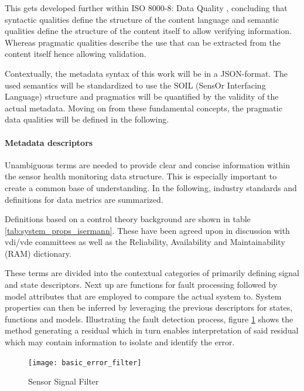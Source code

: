 This gets developed further within ISO 8000-8: Data Quality \cite{iso_data-quality_information_2015}, concluding that syntactic qualities define the structure of the content language and semantic qualities define the structure of the content itself to allow verifying information. Whereas pragmatic qualities describe the use that can be extracted from the content itself hence allowing validation.

Contextually, the metadata syntax of this work will be in a JSON-format. The used semantics will be standardized to use the SOIL (SensOr Interfacing Language) structure and pragmatics will be quantified by the validity of the actual metadata.
Moving on from these fundamental concepts, the pragmatic data qualities will be defined in the following.

\paragraph{Metadata descriptors}

Unambiguous terms are needed to provide clear and concise information within the sensor health monitoring data structure. This is especially important to create a common base of understanding. In the following, industry standards and definitions for data metrics are summarized.

Definitions based on a control theory background are shown in table \ref{tab:system_props_isermann}. These have been agreed upon in discussion with vdi/vde committees as well as the Reliability, Availability and Maintainability (RAM) dictionary. \cite{isermann_trends_nodate,din_din25424_fehlerbaumanalysepdf_1977}

These terms are divided into the contextual categories of primarily defining signal and state descriptors. Next up are functions for fault processing followed by model attributes that are employed to compare the actual system to. System properties can then be inferred by leveraging the previous descriptors for states, functions and models. Illustrating the fault detection process, figure \ref{fig:basic_error_filter} shows the method generating a residual which in turn enables interpretation of said residual which may contain information to isolate and identify the error.


\begin{figure}[ht]
    \centering
    \texttt{[image: basic\_error\_filter]}
    \caption{Sensor Signal Filter}
    \label{fig:basic_error_filter}
\end{figure}





